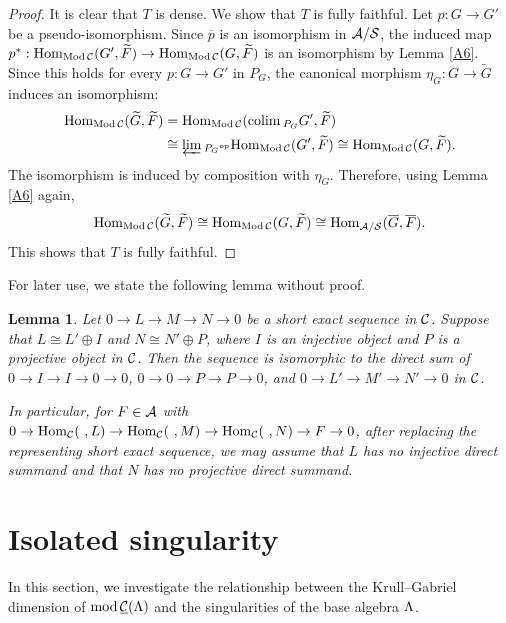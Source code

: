 \documentclass[11pt]{amsart}
\newtheorem{lemma}[theorem]{Lemma}
\theoremstyle{definition}
\numberwithin{equation}{section}
\begin{document}
\begin{proof}
It is clear that $T$ is dense. 
We show that $T$ is fully faithful. 
Let $p: G \to G'$ be a pseudo-isomorphism. 
Since $\overline{p}$ is an isomorphism in $\AA / \SS$, the induced map $p^{\ast} :\Hom_{\ModCC }(G',\widetilde{F}) \to \Hom_{\ModCC} (G,\widetilde{F})$ is an isomorphism by Lemma \ref{A6}. 
Since this holds for every $p:G\to G'$ in $P_G$, the canonical morphism $\eta_G : G \to \widetilde{G}$ induces an isomorphism: 
\begin{align*}
\Hom_{\ModCC} (\widetilde{G}, \widetilde{F}) &= \Hom_{\ModCC} (\colim {}_{P_G}G', \widetilde{F}) \\
 &\cong \varprojlim {}_{{P_G}^{op}} \Hom_{\ModCC} (G', \widetilde{F}) \cong \Hom_{\ModCC}(G,\widetilde{F}).
\end{align*}
The isomorphism is induced by composition with $\eta_G$.
Therefore, using Lemma \ref{A6} again, 
$$
\Hom_{\ModCC} (\widetilde{G}, \widetilde{F}) \cong \Hom_{\ModCC} (G, \widetilde{F}) \cong \Hom_{\AA /  \SS } ( \overline{G}, \overline{F}).  
$$
This shows that $T$ is fully faithful.  
\end{proof}

For later use, we state the following lemma without proof. 

\begin{lemma}\label{A10}
Let $0\to L\to M \to  N \to 0$ be a short exact sequence in $\CC$. 
Suppose that $L\cong L'\oplus I$ and $N\cong N'\oplus P$, where $I$ is an injective object and $P$ is a projective object in $\CC$. 
Then the sequence is isomorphic to the direct sum of $0\to I \to  I\to0\to0$, $0 \to 0 \to P \to P \to 0$, and $0\to L'\to M'\to N' \to 0$ in $\CC$. 

In particular, for $F \in \AA$ with $0 \to \Hom_{\CC} (\  , L) \to \Hom_{\CC} (\  , M) \to \Hom_{\CC} (\   , N) \to F \to 0$, after replacing the representing short exact sequence, we may assume that $L$ has no injective direct summand and that $N$ has no projective direct summand.
\end{lemma}
\section{Isolated singularity}\label{B}

In this section, we investigate the relationship between the Krull--Gabriel dimension of $\modsCML$ and the singularities of the base algebra $\LL$. 
\end{document}
